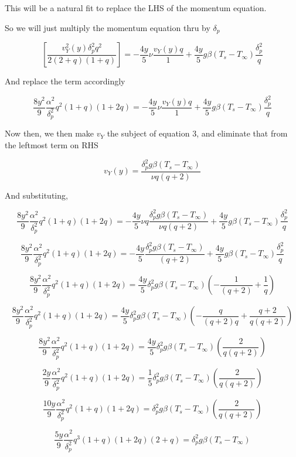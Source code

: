 \documentclass[11pt]{article}
\begin{document}
This will be a natural fit to replace the LHS of the momentum equation.

So we will just multiply the momentum equation thru by $\delta_p$ 

$$\left[  \frac{v_Y^2 (y) \delta_p^2 q^2  }{2(2+q)(1+ q)} \right] = -\frac{4y}{5} \nu  \frac{ v_Y (y) q}{1} + \frac{4y}{5}  g\beta  (T_s -T_\infty) \frac{\delta_p^2}{q}$$

And replace the term accordingly

$$\frac{8 y^2}{9} \frac{\alpha^2}{\delta_p^2}q^2 (1 + q)(1+2q) = -\frac{4y}{5} \nu  \frac{ v_Y (y) q}{1} + \frac{4y}{5}  g\beta  (T_s -T_\infty) \frac{\delta_p^2}{q}$$

Now then,  we then make $v_Y$ the subject of equation 3,  and eliminate that from the leftmost term on RHS

$$    v_Y (y)   =  \frac{\delta_p^2 g\beta (T_s -T_\infty)}{\nu q (q+2)} $$

And substituting,

$$\frac{8 y^2}{9} \frac{\alpha^2}{\delta_p^2}q^2 (1 + q)(1+2q) = -\frac{4y}{5} \nu q \frac{\delta_p^2 g\beta (T_s -T_\infty)}{\nu q (q+2)}  + \frac{4y}{5}  g\beta  (T_s -T_\infty) \frac{\delta_p^2}{q}$$

$$\frac{8 y^2}{9} \frac{\alpha^2}{\delta_p^2}q^2 (1 + q)(1+2q) = -\frac{4y}{5}  \frac{\delta_p^2 g\beta (T_s -T_\infty)}{ (q+2)}  + \frac{4y}{5}  g\beta  (T_s -T_\infty) \frac{\delta_p^2}{q}$$

$$\frac{8 y^2}{9} \frac{\alpha^2}{\delta_p^2}q^2 (1 + q)(1+2q) = \frac{4y}{5} \delta_p^2 g\beta (T_s - T_\infty) \left( -  \frac{1}{ (q+2)}  +   \frac{1}{q} \right)$$

$$\frac{8 y^2}{9} \frac{\alpha^2}{\delta_p^2}q^2 (1 + q)(1+2q) = \frac{4y}{5} \delta_p^2 g\beta (T_s - T_\infty) \left( -  \frac{q}{ (q+2)q}  +   \frac{q+2}{q(q+2)} \right)$$

$$\frac{8 y^2}{9} \frac{\alpha^2}{\delta_p^2}q^2 (1 + q)(1+2q) = \frac{4y}{5} \delta_p^2 g\beta (T_s - T_\infty) \left(   \frac{2}{q(q+2)} \right)$$

$$\frac{2 y}{9} \frac{\alpha^2}{\delta_p^2}q^2 (1 + q)(1+2q) = \frac{1}{5} \delta_p^2 g\beta (T_s - T_\infty) \left(   \frac{2}{q(q+2)} \right)$$

$$\frac{10 y}{9} \frac{\alpha^2}{\delta_p^2}q^2 (1 + q)(1+2q) =  \delta_p^2 g\beta (T_s - T_\infty) \left(   \frac{2}{q(q+2)} \right)$$

$$\frac{5 y}{9} \frac{\alpha^2}{\delta_p^2}q^3 (1 + q)(1+2q)(2+q) =  \delta_p^2 g\beta (T_s - T_\infty) $$
\end{document}
